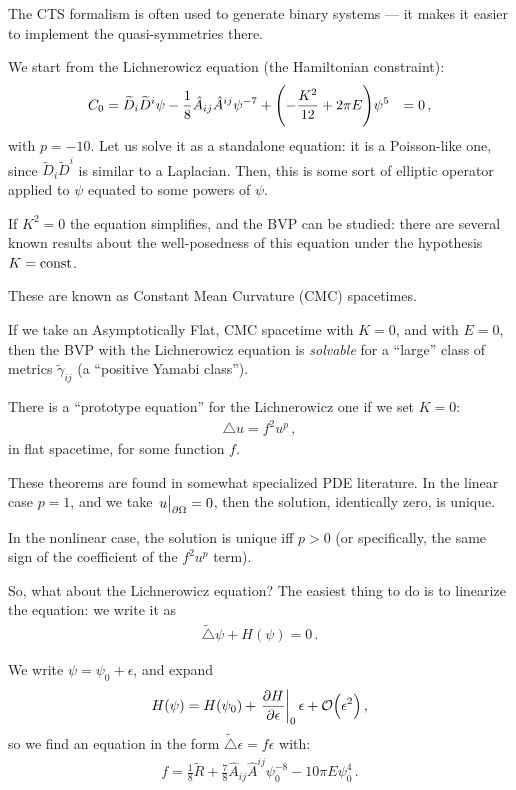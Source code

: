 \documentclass[main.tex]{subfiles}
\begin{document}
The CTS formalism is often used to generate binary systems --- it makes it easier to implement the quasi-symmetries there. 

We start from the Lichnerowicz equation (the Hamiltonian constraint): 
%
\begin{align}
C_0 &= \widetilde{D}_i \widetilde{D}^{i} \psi 
- \frac{1}{8} \hat{A}_{ij} \hat{A}^{ij} \psi^{-7} +
\qty(- \frac{K^2}{12} + 2 \pi E) \psi^{5} &= 0
\,,
\end{align}
%
with \(p = -10\). 
Let us solve it as a standalone equation: it is a Poisson-like one, since \(\widetilde{D}_i \widetilde{D}^{i}\) is similar to a Laplacian. 
Then, this is some sort of elliptic operator applied to \(\psi \) equated to some powers of \(\psi \). 

If \(K^2= 0\) the equation simplifies, and the BVP can be studied: there are several known results about the well-posedness of this equation under the hypothesis \(K = \text{const}\).

These are known as Constant Mean Curvature (CMC) spacetimes. 

If we take an Asymptotically Flat, CMC spacetime with \(K = 0\), and with \(E = 0\), then the BVP with the Lichnerowicz equation is \emph{solvable} for a ``large'' class of metrics \(\widetilde{\gamma}_{ij}\) (a ``positive Yamabi class''). 

There is a ``prototype equation'' for the Lichnerowicz one if we set \(K = 0\): 
%
\begin{align}
\triangle u = f^2 u^{p}
\,,
\end{align}
%
in flat spacetime, for some function \(f\).

These theorems are found in somewhat specialized PDE literature.
In the linear case \(p = 1\), and we take \(\eval{u}_{\partial \Omega } = 0\), then the solution, identically zero, is unique. 

In the nonlinear case, the solution is unique iff \(p > 0\) (or specifically, the same sign of the coefficient of the \(f^2 u^{p}\) term). 

So, what about the Lichnerowicz equation? 
The easiest thing to do is to linearize the equation: we write it as 
%
\begin{align}
\widetilde{\triangle} \psi + H (\psi ) = 0
\,.
\end{align}

We write \(\psi = \psi_0 + \epsilon \), and expand 
%
\begin{align}
H(\psi ) = H(\psi_0 ) + \eval{\pdv{H}{\epsilon }}_{0} \epsilon + \order{\epsilon^2}
\,,
\end{align}
%
so we find an equation in the form \(\widetilde{\triangle} \epsilon = f \epsilon \) with: 
%
\begin{align}
f = \frac{1}{8 } \widetilde{R} + \frac{7}{8} \hat{A}_{ij} \hat{A}^{ij} \psi_0^{-8} - 10 \pi E \psi_0^{4}
\,.
\end{align}
\end{document}
